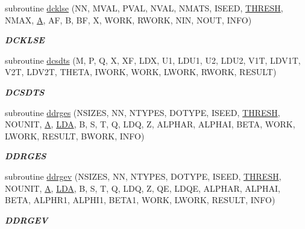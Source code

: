 \begin{DoxyCompactItemize}
subroutine \hyperlink{group__double__eig_ga4d9cfcdec43b543507c9b770e2d4e0e3}{dcklse} (N\+N, M\+V\+A\+L, P\+V\+A\+L, N\+V\+A\+L, N\+M\+A\+T\+S, I\+S\+E\+E\+D, \hyperlink{zlaqgs_8c_a0656018abfc9fa2821827415f5d5ea57}{T\+H\+R\+E\+S\+H}, N\+M\+A\+X, \hyperlink{classA}{A}, A\+F, B, B\+F, X, W\+O\+R\+K, R\+W\+O\+R\+K, N\+I\+N, N\+O\+U\+T, I\+N\+F\+O)
\begin{DoxyCompactList}\small\item\em {\bfseries D\+C\+K\+L\+S\+E} \end{DoxyCompactList}\item 
subroutine \hyperlink{group__double__eig_ga03cd3ed37d8c793d58398c431d01ea1d}{dcsdts} (M, P, Q, X, X\+F, L\+D\+X, U1, L\+D\+U1, U2, L\+D\+U2, V1\+T, L\+D\+V1\+T, V2\+T, L\+D\+V2\+T, T\+H\+E\+T\+A, I\+W\+O\+R\+K, W\+O\+R\+K, L\+W\+O\+R\+K, R\+W\+O\+R\+K, R\+E\+S\+U\+L\+T)
\begin{DoxyCompactList}\small\item\em {\bfseries D\+C\+S\+D\+T\+S} \end{DoxyCompactList}\item 
subroutine \hyperlink{group__double__eig_ga6cc419f7585f852ef90e140e55fdfd49}{ddrges} (N\+S\+I\+Z\+E\+S, N\+N, N\+T\+Y\+P\+E\+S, D\+O\+T\+Y\+P\+E, I\+S\+E\+E\+D, \hyperlink{zlaqgs_8c_a0656018abfc9fa2821827415f5d5ea57}{T\+H\+R\+E\+S\+H}, N\+O\+U\+N\+I\+T, \hyperlink{classA}{A}, \hyperlink{example__user_8c_ae946da542ce0db94dced19b2ecefd1aa}{L\+D\+A}, B, S, T, Q, L\+D\+Q, Z, A\+L\+P\+H\+A\+R, A\+L\+P\+H\+A\+I, B\+E\+T\+A, W\+O\+R\+K, L\+W\+O\+R\+K, R\+E\+S\+U\+L\+T, B\+W\+O\+R\+K, I\+N\+F\+O)
\begin{DoxyCompactList}\small\item\em {\bfseries D\+D\+R\+G\+E\+S} \end{DoxyCompactList}\item 
subroutine \hyperlink{group__double__eig_ga5dd9ec32424dde4c58b7f7b35365e879}{ddrgev} (N\+S\+I\+Z\+E\+S, N\+N, N\+T\+Y\+P\+E\+S, D\+O\+T\+Y\+P\+E, I\+S\+E\+E\+D, \hyperlink{zlaqgs_8c_a0656018abfc9fa2821827415f5d5ea57}{T\+H\+R\+E\+S\+H}, N\+O\+U\+N\+I\+T, \hyperlink{classA}{A}, \hyperlink{example__user_8c_ae946da542ce0db94dced19b2ecefd1aa}{L\+D\+A}, B, S, T, Q, L\+D\+Q, Z, Q\+E, L\+D\+Q\+E, A\+L\+P\+H\+A\+R, A\+L\+P\+H\+A\+I, B\+E\+T\+A, A\+L\+P\+H\+R1, A\+L\+P\+H\+I1, B\+E\+T\+A1, W\+O\+R\+K, L\+W\+O\+R\+K, R\+E\+S\+U\+L\+T, I\+N\+F\+O)
\begin{DoxyCompactList}\small\item\em {\bfseries D\+D\+R\+G\+E\+V} \end{DoxyCompactList}\item 

\end{DoxyCompactItemize}
